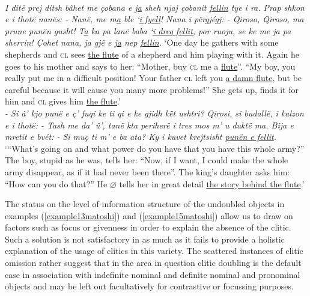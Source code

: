 \documentclass[output=paper]{langsci/langscibook}
\begin{document}
\ea \label{example14matoshi} 
	\\
	\textit{I ditë prej ditsh bâhet me çobana e j\uline{a} sheh njaj çobanit \uline{fellin} tye i ra. Prap shkon e i thotë nanës: - Nanë, me m\uline{a} ble ‘\uline{i fyell}! Nana i përgjégj: - Qiroso, Qiroso, ma prune punën gusht! T\uline{a} ka pa lanë baba ‘\uline{i dreq fellit}, por ruoju, se ke me ja pa sherrin! Çohet nana, ja gjê e j\uline{a} nep \uline{fellin}.}
	\glt ‘One day he gathers with some shepherds and \textsc{cl} sees \uline{the flute} of a shepherd and him playing with it. Again he goes to his mother and says to her: \enquote{Mother, buy \textsc{cl} me a \uline{flute}}. \enquote{My boy, you really put me in a difficult position! Your father \textsc{cl} left you \uline{a damn flute}, but be careful because it will cause you many more problems!} She gets up, finds it for him and \textsc{cl} gives him \uline{the flute}.’
\ex \label{example15matoshi} 
	\\
	\textit{- Si â’ kjo punë e ç’ fuqi ke ti qi e ke gjidh kët ushtri? Qirosi, si budallë, i kalzon e i thotë: - Tash me da’ û’, tanë kta periherë i tres mos m’ u duktë ma. Bija e mretit e bvét: - Si muç ti m’ e ba ata? Ky i kuvet krejtsisht \uline{punën e fellit}.}
	\glt ‘\enquote{What's going on and what power do you have that you have this whole army?} The boy, stupid as he was, tells her: \enquote{Now, if I want, I could make the whole army disappear, as if it had never been there}. The king's daughter asks him: \enquote{How can you do that?} He $\varnothing$ tells her in great detail \uline{the story behind the flute}.’
 \z

The status on the level of information structure of the undoubled objects in examples (\ref{example13matoshi}) and (\ref{example15matoshi}) allow us to draw on factors such as focus or givenness in order to explain the absence of the clitic. Such a solution is not satisfactory in as much as it fails to provide a holistic explanation of the usage of clitics in this variety. The scattered instances of clitic omission rather suggest that in the area in question clitic doubling is the default case in association with indefinite nominal and definite nominal and pronominal objects and may be left out facultatively for contrastive or focussing purposes. 
\end{document}
